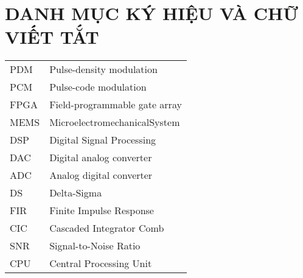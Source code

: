 \section*{DANH MỤC KÝ HIỆU VÀ CHỮ VIẾT TẮT}
 {}

\begin{tabular}{ l l }
\hspace{1cm} PDM & \hspace{4cm} Pulse-density modulation \\ 
\hspace{1cm} PCM & \hspace{4cm} Pulse-code modulation \\ 
\hspace{1cm} FPGA & \hspace{4cm} Field-programmable gate array \\ 
\hspace{1cm} MEMS & \hspace{4cm} MicroelectromechanicalSystem \\ 
\hspace{1cm} DSP & \hspace{4cm} Digital Signal Processing \\  
\hspace{1cm} DAC & \hspace{4cm} Digital analog converter \\  
\hspace{1cm} ADC& \hspace{4cm} Analog digital converter    \\
\hspace{1cm} DS  & \hspace{4cm} Delta-Sigma\\
\hspace{1cm} FIR & \hspace{4cm} Finite Impulse Response \\  
\hspace{1cm} CIC & \hspace{4cm} Cascaded Integrator Comb \\ 
\hspace{1cm} SNR & \hspace{4cm} Signal-to-Noise Ratio  \\ 
\hspace{1cm} CPU & \hspace{4cm} Central Processing Unit  \\ 

\end{tabular}
